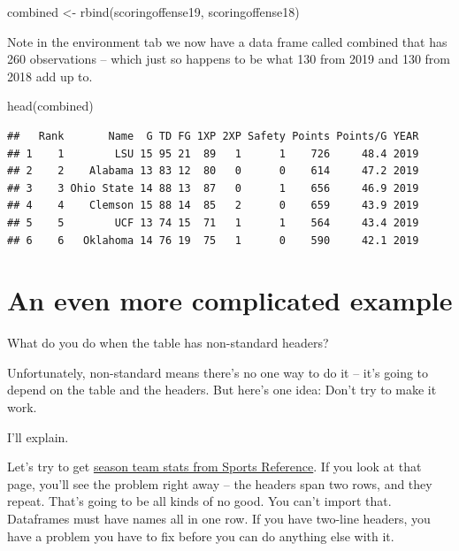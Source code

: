 \documentclass[
]{book}
\newenvironment{Shaded}{\begin{snugshade}}{\end{snugshade}}
\newcommand{\FunctionTok}[1]{\textcolor[rgb]{0.00,0.00,0.00}{#1}}
\newcommand{\NormalTok}[1]{#1}
\newcommand{\OtherTok}[1]{\textcolor[rgb]{0.56,0.35,0.01}{#1}}
\begin{document}
\begin{Shaded}
\begin{Highlighting}[]
\NormalTok{combined }\OtherTok{\textless{}{-}} \FunctionTok{rbind}\NormalTok{(scoringoffense19, scoringoffense18)}
\end{Highlighting}
\end{Shaded}

Note in the environment tab we now have a data frame called combined that has 260 observations -- which just so happens to be what 130 from 2019 and 130 from 2018 add up to.

\begin{Shaded}
\begin{Highlighting}[]
\FunctionTok{head}\NormalTok{(combined)}
\end{Highlighting}
\end{Shaded}

\begin{verbatim}
##   Rank       Name  G TD FG 1XP 2XP Safety Points Points/G YEAR
## 1    1        LSU 15 95 21  89   1      1    726     48.4 2019
## 2    2    Alabama 13 83 12  80   0      0    614     47.2 2019
## 3    3 Ohio State 14 88 13  87   0      1    656     46.9 2019
## 4    4    Clemson 15 88 14  85   2      0    659     43.9 2019
## 5    5        UCF 13 74 15  71   1      1    564     43.4 2019
## 6    6   Oklahoma 14 76 19  75   1      0    590     42.1 2019
\end{verbatim}

\hypertarget{an-even-more-complicated-example}{%
\section{An even more complicated example}\label{an-even-more-complicated-example}}

What do you do when the table has non-standard headers?

Unfortunately, non-standard means there's no one way to do it -- it's going to depend on the table and the headers. But here's one idea: Don't try to make it work.

I'll explain.

Let's try to get \href{https://www.sports-reference.com/cbb/seasons/2019-school-stats.html}{season team stats from Sports Reference}. If you look at that page, you'll see the problem right away -- the headers span two rows, and they repeat. That's going to be all kinds of no good. You can't import that. Dataframes must have names all in one row. If you have two-line headers, you have a problem you have to fix before you can do anything else with it.
\end{document}
